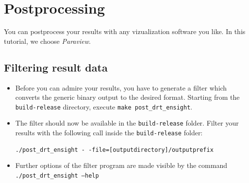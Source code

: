 \section{Postprocessing}

You can postprocess your results with any vizualization software you like. In this tutorial, we choose \emph{Paraview}. 

\subsection{Filtering result data}
\begin{itemize}
\item Before you can admire your results, you have to generate a filter 
which converts the generic binary \baci{} output to the desired format.
Starting from the \texttt{build-release} directory, execute \texttt{make post\_drt\_ensight}.
\item The filter should now be available in the \texttt{build-release} folder. Filter your results with the following call inside the \texttt{build-release} folder:
\begin{center}
\texttt{./post\_drt\_ensight -\,-file=[outputdirectory]/outputprefix}
\end{center}
\item Further options of the filter program are made visible by the command \texttt{./post\_drt\_ensight --help}
\end{itemize}

